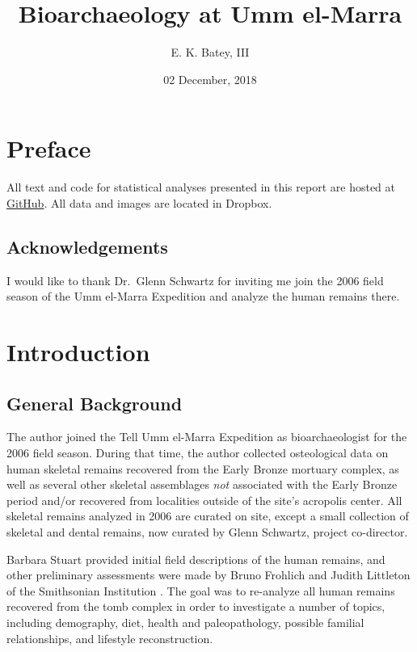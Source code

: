 \documentclass[]{book}
\title{Bioarchaeology at Umm el-Marra}
\author{E. K. Batey, III}
\date{02 December, 2018}
\begin{document}
\maketitle

{
\setcounter{tocdepth}{1}
\tableofcontents
}
\chapter*{Preface}\label{preface}

All text and code for statistical analyses presented in this report are
hosted at \href{https://www.github.com/bateyt/elmarra-bioarch}{GitHub}.
All data and images are located in Dropbox.

\section*{Acknowledgements}\label{acknowledgements}

I would like to thank Dr.~Glenn Schwartz for inviting me join the 2006
field season of the Umm el-Marra Expedition and analyze the human
remains there.

\chapter{Introduction}\label{intro}

\section{General Background}\label{general-background}

The author joined the Tell Umm el-Marra Expedition as bioarchaeologist
for the 2006 field season. During that time, the author collected
osteological data on human skeletal remains recovered from the Early
Bronze mortuary complex, as well as several other skeletal assemblages
\emph{not} associated with the Early Bronze period and/or recovered from
localities outside of the site's acropolis center. All skeletal remains
analyzed in 2006 are curated on site, except a small collection of
skeletal and dental remains, now curated by Glenn Schwartz, project
co-director.

Barbara Stuart provided initial field descriptions of the human remains,
and other preliminary assessments were made by Bruno Frohlich and Judith
Littleton of the Smithsonian Institution \citep{schwartz2007hidden}. The
goal was to re-analyze all human remains recovered from the tomb complex
in order to investigate a number of topics, including demography, diet,
health and paleopathology, possible familial relationships, and
lifestyle reconstruction.
\end{document}
